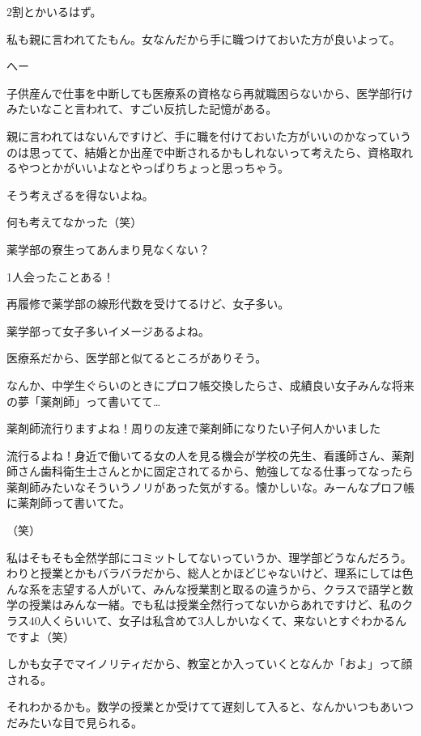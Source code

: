 \begin{multicols}{2}
  2割とかいるはず。

  私も親に言われてたもん。女なんだから手に職つけておいた方が良いよって。

  へー

  子供産んで仕事を中断しても医療系の資格なら再就職困らないから、医学部行けみたいなこと言われて、すごい反抗した記憶がある。

  親に言われてはないんですけど、手に職を付けておいた方がいいのかなっていうのは思ってて、結婚とか出産で中断されるかもしれないって考えたら、資格取れるやつとかがいいよなとやっぱりちょっと思っちゃう。

  そう考えざるを得ないよね。

  何も考えてなかった（笑）

  薬学部の寮生ってあんまり見なくない？

  1人会ったことある！

  再履修で薬学部の線形代数を受けてるけど、女子多い。

  薬学部って女子多いイメージあるよね。

  医療系だから、医学部と似てるところがありそう。

  なんか、中学生ぐらいのときにプロフ帳交換したらさ、成績良い女子みんな将来の夢「薬剤師」って書いてて…

  薬剤師流行りますよね！周りの友達で薬剤師になりたい子何人かいました

  流行るよね！身近で働いてる女の人を見る機会が学校の先生、看護師さん、薬剤師さん歯科衛生士さんとかに固定されてるから、勉強してなる仕事ってなったら薬剤師みたいなそういうノリがあった気がする。懐かしいな。みーんなプロフ帳に薬剤師って書いてた。

  （笑）

  私はそもそも全然学部にコミットしてないっていうか、理学部どうなんだろう。わりと授業とかもバラバラだから、総人とかほどじゃないけど、理系にしては色んな系を志望する人がいて、みんな授業割と取るの違うから、クラスで語学と数学の授業はみんな一緒。でも私は授業全然行ってないからあれですけど、私のクラス40人くらいいて、女子は私含めて3人しかいなくて、来ないとすぐわかるんですよ（笑）

  しかも女子でマイノリティだから、教室とか入っていくとなんか「およ」って顔される。

  それわかるかも。数学の授業とか受けてて遅刻して入ると、なんかいつもあいつだみたいな目で見られる。


\end{multicols}
